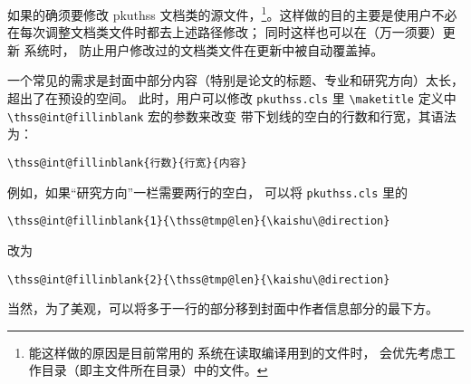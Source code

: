 如果的确须要修改 pkuthss 文档类的源文件，\footnote{%
	能这样做的原因是目前常用的  系统在读取编译用到的文件时，
	会优先考虑工作目录（即主文件所在目录）中的文件。%
}。这样做的目的主要是使用户不必在每次调整文档类文件时都去上述路径修改；
同时这样也可以在（万一须要）更新  系统时，
防止用户修改过的文档类文件在更新中被自动覆盖掉。

一个常见的需求是封面中部分内容（特别是论文的标题、专业和研究方向）太长，
超出了在预设的空间。
此时，用户可以修改 \verb|pkuthss.cls| 里 \verb|\maketitle| 定义中
\verb|\thss@int@fillinblank| 宏的参数来改变
带下划线的空白的行数和行宽，其语法为：
\begin{Verbatim}
\thss@int@fillinblank{行数}{行宽}{内容}
\end{Verbatim}
例如，如果“研究方向”一栏需要两行的空白，
可以将 \verb|pkuthss.cls| 里的
\begin{Verbatim}
\thss@int@fillinblank{1}{\thss@tmp@len}{\kaishu\@direction}
\end{Verbatim}
改为
\begin{Verbatim}
\thss@int@fillinblank{2}{\thss@tmp@len}{\kaishu\@direction}
\end{Verbatim}
当然，为了美观，可以将多于一行的部分移到封面中作者信息部分的最下方。

